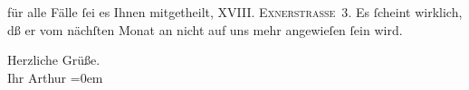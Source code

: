                für alle Fälle{ }ſei es Ihnen mitgetheilt, \textsc{XVIII. Exnerstraße 3}. Es{ }ſcheint wirklich, dß er vom nächſten Monat {\pb}an
               nicht auf uns mehr angewieſen{ }ſein wird.\pend
           
\pstart
           Herzliche Grüße.{\\[\baselineskip]}Ihr \spacefill\mbox{Arthur}\pend
           \leftskip=0em{}\endnumbering{}  \newcommand{\dateiname}{L00324}\newcommand{\titel}{Arthur Schnitzler an Hugo von Hofmannsthal, [15. 5. 1894?]}\newcommand{\editorInnen}{Martin Anton Müller und Gerd-Hermann Susen}

